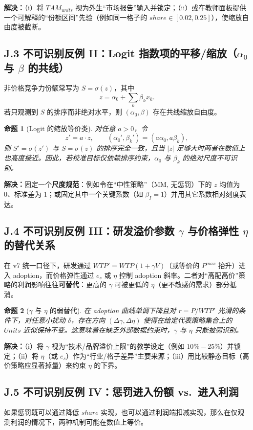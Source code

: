 \documentclass[UTF8,12pt]{ctexart}
\newtheorem{proposition}{命题}
\begin{document}
\textbf{解决：}（i）将 $TAM_{units}$ 视为外生“市场报告”输入并锁定；（ii）或在教师面板提供一个可解释的“份额区间”先验（例如同一格子的 $share\in[0.02,0.25]$），使缩放自由度被截断。

\subsection{J.3 不可识别反例 II：Logit 指数项的平移/缩放（$\alpha_0$ 与 $\beta$ 的共线）}
非价格竞争力份额常写为 $S=\sigma(z)$，其中
\[
z=\alpha_0+\sum_k \beta_k x_k.
\]
若只观测到 $S$ 的排序而非绝对水平，则 $(\alpha_0,\beta)$ 存在共线缩放自由度。

\begin{proposition}[Logit 的缩放等价类]\label{prop:logit_scale}
对任意 $a>0$，令
\[
z' = a\cdot z,\qquad (\alpha_0',\beta_k')=(a\alpha_0,a\beta_k),
\]
则 $S'=\sigma(z')$ 与 $S=\sigma(z)$ 的\emph{排序}完全一致，且当 $|z|$ 足够大时两者在数值上也高度接近。因此，若校准目标仅依赖排序约束，$\alpha_0$ 与 $\beta_k$ 的绝对尺度不可识别。
\end{proposition}

\textbf{解决：}固定一个\textbf{尺度规范}：例如令在“中性策略”（MM, 无惩罚）下的 $z$ 均值为 0、标准差为 1；或固定其中一个关键系数（如 $\beta_I=1$）并用其它系数相对刻度表达。

\subsection{J.4 不可识别反例 III：研发溢价参数 $\gamma$ 与价格弹性 $\eta$ 的替代关系}
在 v7 统一口径下，研发通过 $WTP'=WTP(1+\gamma V)$（或等价的 $P^{max}$ 抬升）进入 adoption，而价格弹性通过 $e_s$ 或 $\eta$ 控制 adoption 斜率。二者对“高配高价”策略的利润影响往往\textbf{可替代}：更高的 $\gamma$ 可被更低的 $\eta$（更不敏感的需求）部分抵消。

\begin{proposition}[$\gamma$ 与 $\eta$ 的弱替代]\label{prop:gamma_eta}
在 adoption 曲线单调下降且对 $r=P/WTP'$ 光滑的条件下，对任意小扰动 $\delta$，存在方向 $(\Delta\gamma,\Delta\eta)$ 使得在给定代表策略集合上的 $Units$ 近似保持不变。这意味着在缺乏外部数据约束时，$\gamma$ 与 $\eta$ 只能被\emph{弱识别}。
\end{proposition}

\textbf{解决：}（i）将 $\gamma$ 视为“技术/品牌溢价上限”的教学设定（例如 $10\%-25\%$）并锁定；（ii）将 $\eta$（或 $e_s$）作为“行业/格子差异”主要来源；（iii）用比较静态目标（高价策略应显著掉量）来约束 $\eta$ 的下界。

\subsection{J.5 不可识别反例 IV：惩罚进入份额 vs.\ 进入利润}
如果惩罚既可以通过降低 $share$ 实现，也可以通过利润端扣减实现，那么在仅观测利润的情况下，两种机制可能在数值上等价。
\end{document}
